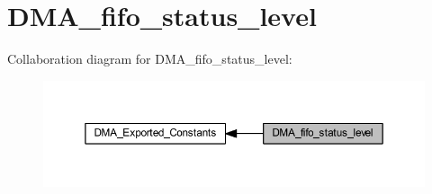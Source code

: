 \hypertarget{group___d_m_a__fifo__status__level}{}\section{D\+M\+A\+\_\+fifo\+\_\+status\+\_\+level}
\label{group___d_m_a__fifo__status__level}
Collaboration diagram for D\+M\+A\+\_\+fifo\+\_\+status\+\_\+level\+:\nopagebreak
\begin{figure}[H]
\begin{center}
\leavevmode
\includegraphics[width=350pt]{group___d_m_a__fifo__status__level}
\end{center}
\end{figure}

